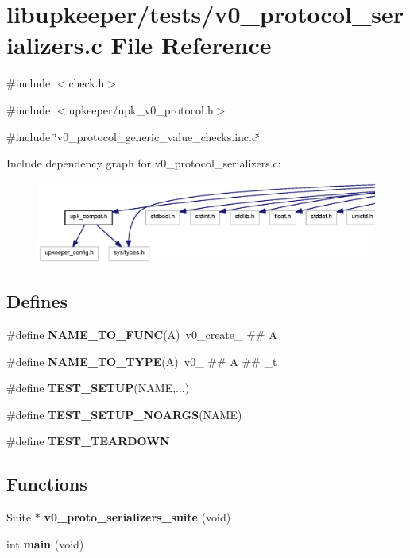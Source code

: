 \section{libupkeeper/tests/v0\_\-protocol\_\-serializers.c File Reference}
\label{v0__protocol__serializers_8c}
{\ttfamily \#include $<$check.h$>$}\par
{\ttfamily \#include $<$upkeeper/upk\_\-v0\_\-protocol.h$>$}\par
{\ttfamily \#include \char`\"{}v0\_\-protocol\_\-generic\_\-value\_\-checks.inc.c\char`\"{}}\par
Include dependency graph for v0\_\-protocol\_\-serializers.c:
\nopagebreak
\begin{figure}[H]
\begin{center}
\leavevmode
\includegraphics[width=400pt]{v0__protocol__serializers_8c__incl}
\end{center}
\end{figure}
\subsection*{Defines}
\begin{DoxyCompactItemize}
\item 
\#define {\bf NAME\_\-TO\_\-FUNC}(A)~v0\_\-create\_\- \#\# A
\item 
\#define {\bf NAME\_\-TO\_\-TYPE}(A)~v0\_\- \#\# A \#\# \_\-t
\item 
\#define {\bf TEST\_\-SETUP}(NAME,...)
\item 
\#define {\bf TEST\_\-SETUP\_\-NOARGS}(NAME)
\item 
\#define {\bf TEST\_\-TEARDOWN}
\end{DoxyCompactItemize}
\subsection*{Functions}
\begin{DoxyCompactItemize}
\item 
Suite $\ast$ {\bf v0\_\-proto\_\-serializers\_\-suite} (void)
\item 
int {\bf main} (void)
\end{DoxyCompactItemize}


